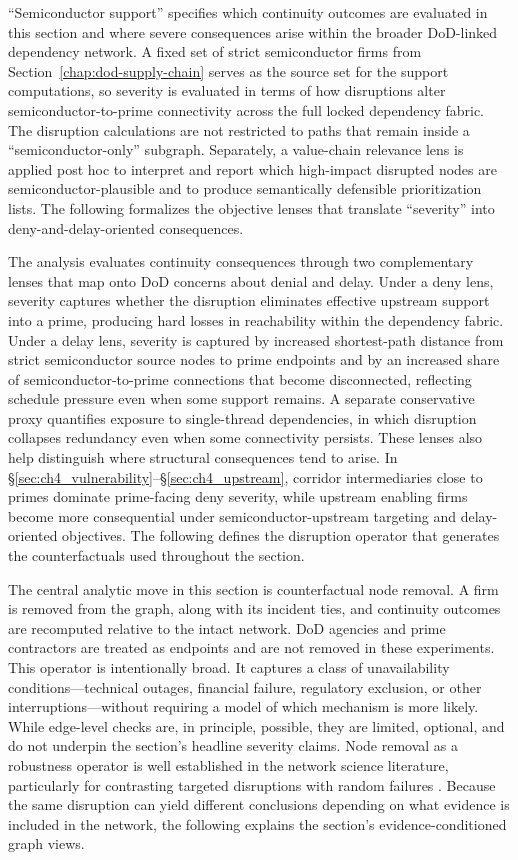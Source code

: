 ``Semiconductor support'' specifies which continuity outcomes are evaluated in this section and where severe consequences arise within the broader DoD-linked dependency network. A fixed set of strict semiconductor firms from Section~\ref{chap:dod-supply-chain} serves as the source set for the support computations, so severity is evaluated in terms of how disruptions alter semiconductor-to-prime connectivity across the full locked dependency fabric. The disruption calculations are not restricted to paths that remain inside a ``semiconductor-only'' subgraph. Separately, a value-chain relevance lens is applied post hoc to interpret and report which high-impact disrupted nodes are semiconductor-plausible and to produce semantically defensible prioritization lists. The following formalizes the objective lenses that translate ``severity'' into deny-and-delay-oriented consequences.

The analysis evaluates continuity consequences through two complementary lenses that map onto DoD concerns about denial and delay. Under a deny lens, severity captures whether the disruption eliminates effective upstream support into a prime, producing hard losses in reachability within the dependency fabric. Under a delay lens, severity is captured by increased shortest-path distance from strict semiconductor source nodes to prime endpoints and by an increased share of semiconductor-to-prime connections that become disconnected, reflecting schedule pressure even when some support remains. A separate conservative proxy quantifies exposure to single-thread dependencies, in which disruption collapses redundancy even when some connectivity persists. These lenses also help distinguish where structural consequences tend to arise. In \S\ref{sec:ch4_vulnerability}--\S\ref{sec:ch4_upstream}, corridor intermediaries close to primes dominate prime-facing deny severity, while upstream enabling firms become more consequential under semiconductor-upstream targeting and delay-oriented objectives. The following defines the disruption operator that generates the counterfactuals used throughout the section.

The central analytic move in this section is counterfactual node removal. A firm is removed from the graph, along with its incident ties, and continuity outcomes are recomputed relative to the intact network. DoD agencies and prime contractors are treated as endpoints and are not removed in these experiments. This operator is intentionally broad. It captures a class of unavailability conditions---technical outages, financial failure, regulatory exclusion, or other interruptions---without requiring a model of which mechanism is more likely. While edge-level checks are, in principle, possible, they are limited, optional, and do not underpin the section's headline severity claims. Node removal as a robustness operator is well established in the network science literature, particularly for contrasting targeted disruptions with random failures \parencite{albert_error_2000,newman_networks_2018}. Because the same disruption can yield different conclusions depending on what evidence is included in the network, the following explains the section's evidence-conditioned graph views.


